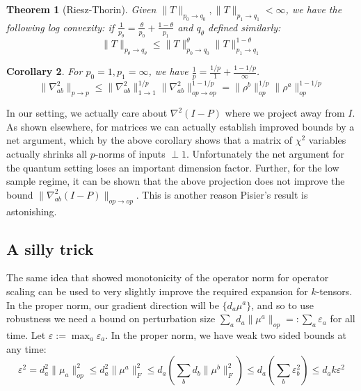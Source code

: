 \documentclass{article}
\newtheorem{theorem}{Theorem}
\newtheorem{corollary}[theorem]{Corollary}
\newcommand\eps{\varepsilon}
\begin{document}
\begin{theorem} [Riesz-Thorin]
Given $\|T\|_{p_{0} \to q_{0}}, \|T\|_{p_{1} \to q_{1}} < \infty$, we have the following log convexity: if $\frac{1}{p_{\theta}} = \frac{\theta}{p_{0}} + \frac{1-\theta}{p_{1}}$ and $q_{\theta}$ defined similarly:
\[ \|T\|_{p_{\theta} \to q_{\theta}} \leq \|T\|_{p_{0} \to q_{0}}^{\theta} \|T\|_{p_{1} \to q_{1}}^{1-\theta}    \]
\end{theorem}

\begin{corollary}
For $p_{0} = 1, p_{1} = \infty$, we have $\frac{1}{p} = \frac{1/p}{1} + \frac{1-1/p}{\infty}$. 
\[ \|\nabla_{ab}^{2}\|_{p \to p} \leq \|\nabla_{ab}^{2}\|_{1 \to 1}^{1/p} \|\nabla_{ab}^{2}\|_{op \to op}^{1-1/p} = \|\rho^{b}\|_{op}^{1/p} \|\rho^{a}\|_{op}^{1-1/p}  \]
\end{corollary}

In our setting, we actually care about $\nabla^{2} (I-P)$ where we project away from $I$. As shown elsewhere, for matrices we can actually establish improved bounds by a net argument, which by the above corollary shows that a matrix of $\chi^{2}$ variables actually shrinks all $p$-norms of inputs $\perp 1$. Unfortunately the net argument for the quantum setting loses an important dimension factor. Further, for the low sample regime, it can be shown that the above projection does not improve the bound $\|\nabla_{ab}^{2} (I-P)\|_{op \to op}$. This is another reason Pisier's result is astonishing. 



\subsection{A silly trick}

The same idea that showed monotonicity of the operator norm for operator scaling can be used to very slightly improve the required expansion for $k$-tensors. In the proper norm, our gradient direction will be $\{d_{a} \mu^{a}\}$, and so to use robustness we need a bound on perturbation size $\sum_{a} d_{a} \|\mu^{a}\|_{op} =: \sum_{a} \eps_{a}$ for all time. Let $\eps := \max_{a} \eps_{a}$. In the proper norm, we have weak two sided bounds at any time:
\[ \eps^{2} = d_{a}^{2} \|\mu_{a}\|_{op}^{2} \leq d_{a}^{2} \|\mu^{a}\|_{F}^{2} \leq d_{a} \left( \sum_{b} d_{b} \|\mu^{b}\|_{F}^{2} \right) \leq d_{a} \left( \sum_{b} \eps_{b}^{2} \right) \leq d_{a} k \eps^{2}   \]
\end{document}
